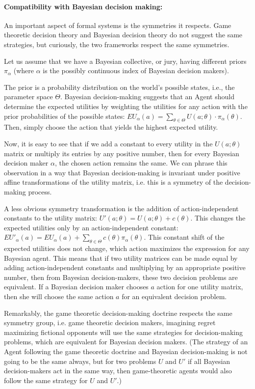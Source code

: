\documentclass{article}
\begin{document}
\paragraph{Compatibility with Bayesian decision making:}
An important aspect of formal systems is the symmetries it respects. Game theoretic decision theory and Bayesian decision theory do not suggest the same strategies, but curiously, the two frameworks respect the same symmetries.

Let us assume that we have a Bayesian collective, or jury, having different priors $\pi_\alpha$ (where $\alpha$ is the possibly continuous index of Bayesian decision makers).

The prior is a probability distribution on the world's possible states, i.e., the parameter space $\Theta$.
Bayesian decision-making suggests that an Agent should determine the expected utilities by weighting the utilities for any action with the prior probabilities of the possible states: $EU_\alpha(a) = \sum_{\theta \in \Theta} U(a;\theta) \cdot \pi_\alpha(\theta)$. Then, simply choose the action that yields the highest expected utility.

Now, it is easy to see that if we add a constant to every utility in the $U(a;\theta)$ matrix or multiply its entries by any positive number, then for every Bayesian decision maker $\alpha$, the chosen action remains the same.
We can phrase this observation in a way that Bayesian decision-making is invariant under positive affine transformations of the utility matrix, i.e. this is a symmetry of the decision-making process.

A less obvious symmetry transformation is the addition of action-independent constants to the utility matrix: $U'(a;\theta) = U(a;\theta) + c(\theta)$. This changes the expected utilities only by an action-independent constant: $EU'_\alpha(a)=EU_\alpha(a)+\sum_{\theta \in \Theta} c(\theta) \pi_\alpha(\theta)$.
This constant shift of the expected utilities does not change, which action maximizes the expression for any Bayesian agent.
This means that if two utility matrices can be made equal by adding action-independent constants and multiplying by an appropriate positive number, then from Bayesian decision-makers, these two decision problems are equivalent. If a Bayesian decision maker chooses $a$ action for one utility matrix, then she will choose the same action $a$ for an equivalent decision problem.

Remarkably, the game theoretic decision-making doctrine respects the same symmetry group, i.e. game theoretic decision makers, imagining regret maximizing fictional opponents will use the same strategies for decision-making problems, which are equivalent for Bayesian decision makers. (The strategy of an Agent following the game theoretic doctrine and Bayesian decision-making is not going to be the same always, but for two problems $U$ and $U'$ if all Bayesian decision-makers act in the same way, then game-theoretic agents would also follow the same strategy for $U$ and $U'$.)
\end{document}
